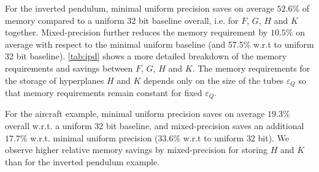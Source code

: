 

For the inverted pendulum, minimal uniform precision saves on average $52.6\%$ of memory
compared to a uniform 32 bit baseline overall, i.e. for $F$, $G$, $H$ and $K$ together. 
Mixed-precision further reduces the memory
requirement by $10.5\%$ on average with respect to the minimal uniform baseline (and 57.5\% w.r.t to 
uniform 32 bit baseline). 
\autoref{tab:ipd} shows a more detailed breakdown of the memory requirements and savings
between $F$, $G$, $H$ and $K$.
The memory requirements for the storage of hyperplanes $H$ and $K$ depends only on
the size of the tubes $\varepsilon_Q$ so that memory requirements remain constant
for fixed $\varepsilon_Q$.

For the aircraft example, minimal uniform precision saves on average $19.3\%$
overall w.r.t. a uniform 32 bit baseline, and mixed-precision saves an
additional $17.7\%$ w.r.t. minimal uniform precision (33.6\% w.r.t to uniform 32 bit). We observe higher relative
memory savings by mixed-precision for storing $H$ and $K$ than for the inverted pendulum example.

